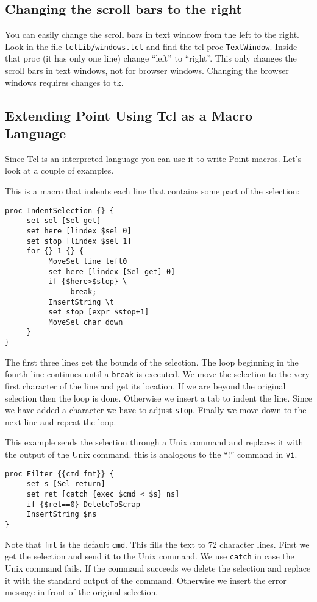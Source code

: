 \subsection{ Changing the scroll bars to the right }

You can easily change the scroll bars in text window from the
left to the right.
Look in the file {\tt tclLib/windows.tcl} and find the tcl proc
{\tt TextWindow}.
Inside that proc (it has only one line) change ``left'' to ``right''.
This only changes the scroll bars in text windows, not for browser
windows.
Changing the browser windows requires changes to tk.




\subsection{ Extending Point Using Tcl as a Macro Language }

Since Tcl is an interpreted language you can use it to write Point macros.
Let's look at a couple of examples.

This is a macro that indents each line that contains some
part of the selection:
\begin{verbatim}
proc IndentSelection {} {
     set sel [Sel get]
     set here [lindex $sel 0]
     set stop [lindex $sel 1]
     for {} 1 {} {
          MoveSel line left0
          set here [lindex [Sel get] 0]
          if {$here>$stop} \
               break;
          InsertString \t
          set stop [expr $stop+1]
          MoveSel char down
     }
}
\end{verbatim}

The first three lines get the bounds of the selection.
The loop beginning in the fourth line continues until a {\tt break}
is executed.
We move the selection to the very first character of the line
and get its location.
If we are beyond the original selection then the loop is done.
Otherwise we insert a tab to indent the line.
Since we have added a character we have to adjust {\tt stop}.
Finally we move down to the next line and repeat the loop.

This example sends the selection through a Unix command and
replaces it with the output of the Unix command.
this is analogous to the ``!'' command in {\tt vi}.
\begin{verbatim}
proc Filter {{cmd fmt}} {
     set s [Sel return]
     set ret [catch {exec $cmd < $s} ns]
     if {$ret==0} DeleteToScrap
     InsertString $ns
}
\end{verbatim}
Note that {\tt fmt} is the default {\tt cmd}.
This fills the text to 72 character lines.
First we get the selection and send it to the Unix command.
We use {\tt catch} in case the Unix command fails.
If the command succeeds we delete the selection
and replace it with the standard output of the command.
Otherwise we insert the error message in front of
the original selection.

